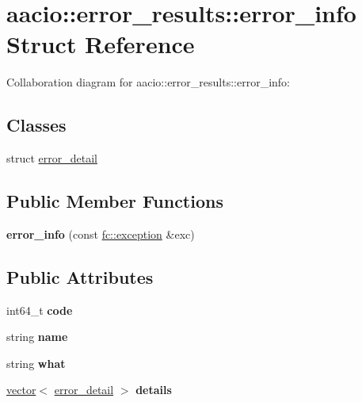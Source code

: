 \hypertarget{structaacio_1_1error__results_1_1error__info}{}\section{aacio\+:\+:error\+\_\+results\+:\+:error\+\_\+info Struct Reference}
\label{structaacio_1_1error__results_1_1error__info}


Collaboration diagram for aacio\+:\+:error\+\_\+results\+:\+:error\+\_\+info\+:
\subsection*{Classes}
\begin{DoxyCompactItemize}
\item 
struct \mbox{\hyperlink{structaacio_1_1error__results_1_1error__info_1_1error__detail}{error\+\_\+detail}}
\end{DoxyCompactItemize}
\subsection*{Public Member Functions}
\begin{DoxyCompactItemize}
\item 
\mbox{\label{structaacio_1_1error__results_1_1error__info_af9c7d101dee342de08615e2af7aef28b}} 
{\bfseries error\+\_\+info} (const \mbox{\hyperlink{classfc_1_1exception}{fc\+::exception}} \&exc)
\end{DoxyCompactItemize}
\subsection*{Public Attributes}
\begin{DoxyCompactItemize}
\item 
\mbox{\label{structaacio_1_1error__results_1_1error__info_a9e823a0ec528fd4ce9583bab63b5a3d1}} 
int64\+\_\+t {\bfseries code}
\item 
\mbox{\label{structaacio_1_1error__results_1_1error__info_a2fc5d81c14fe8addcec694dde30aee47}} 
string {\bfseries name}
\item 
\mbox{\label{structaacio_1_1error__results_1_1error__info_a5dfca6e649389c01515c906ca2e45693}} 
string {\bfseries what}
\item 
\mbox{\label{structaacio_1_1error__results_1_1error__info_ae77b767c133eaf106b06409046e63e51}} 
\mbox{\hyperlink{classstd_1_1vector}{vector}}$<$ \mbox{\hyperlink{structaacio_1_1error__results_1_1error__info_1_1error__detail}{error\+\_\+detail}} $>$ {\bfseries details}
\end{DoxyCompactItemize}
